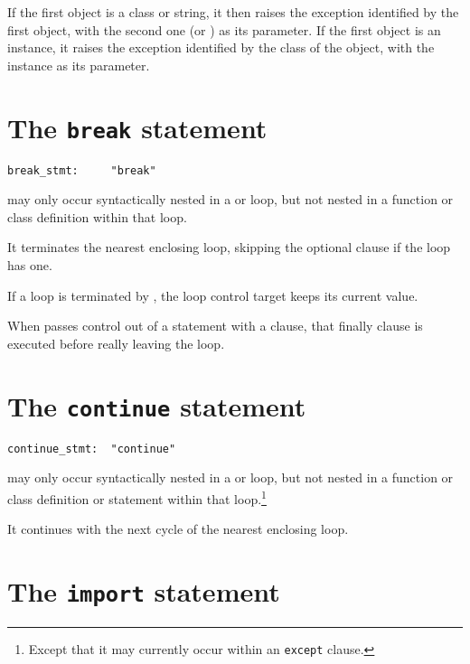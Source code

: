 If the first object is a class or string, it then raises the exception
identified by the first object, with the second one (or \verb@None@)
as its parameter.  If the first object is an instance, it raises the
exception identified by the class of the object, with the instance as
its parameter.

\section{The {\tt break} statement}

\begin{verbatim}
break_stmt:     "break"
\end{verbatim}

\verb@break@ may only occur syntactically nested in a \verb@for@
or \verb@while@ loop, but not nested in a function or class definition
within that loop.

It terminates the nearest enclosing loop, skipping the optional
\verb@else@ clause if the loop has one.

If a \verb@for@ loop is terminated by \verb@break@, the loop control
target keeps its current value.

When \verb@break@ passes control out of a \verb@try@ statement
with a \verb@finally@ clause, that finally clause is executed
before really leaving the loop.

\section{The {\tt continue} statement}

\begin{verbatim}
continue_stmt:  "continue"
\end{verbatim}

\verb@continue@ may only occur syntactically nested in a \verb@for@ or
\verb@while@ loop, but not nested in a function or class definition or
\verb@try@ statement within that loop.\footnote{Except that it may
currently occur within an {\tt except} clause.}

It continues with the next cycle of the nearest enclosing loop.

\section{The {\tt import} statement} \label{import}

